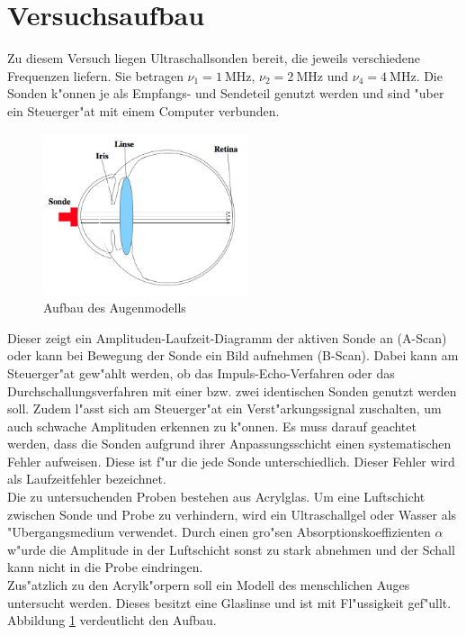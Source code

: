 \section{Versuchsaufbau} %
\label{sec:durchf_uhrung}
	Zu diesem Versuch liegen Ultraschallsonden bereit, die jeweils verschiedene Frequenzen liefern.
	Sie betragen $\nu_1 = \SI{1}{\mega \hertz}$, $\nu_2 = \SI{2}{\mega \hertz}$ und $\nu_4 = \SI{4}{\mega \hertz}$.
	Die Sonden k"onnen je als Empfangs- und Sendeteil genutzt werden und sind "uber ein Steuerger"at mit einem Computer verbunden.

	\begin{figure}
		\centering
		\includegraphics[width = 6cm]{img/auge.jpeg}
		\caption{Aufbau des Augenmodells \cite{anleitung} \label{fig:auge}}
	\end{figure}

	Dieser zeigt ein Amplituden-Laufzeit-Diagramm der aktiven Sonde an (A-Scan) oder kann bei Bewegung der Sonde ein Bild aufnehmen (B-Scan).
	Dabei kann am Steuerger"at gew"ahlt werden, ob das Impuls-Echo-Verfahren oder das Durchschallungsverfahren mit einer bzw. zwei identischen Sonden genutzt werden soll.
	Zudem l"asst sich am Steuerger"at ein Verst"arkungssignal zuschalten, um auch schwache Amplituden erkennen zu k"onnen.
	Es muss darauf geachtet werden, dass die Sonden aufgrund ihrer Anpassungsschicht einen systematischen Fehler aufweisen. Diese ist f"ur die jede Sonde unterschiedlich. Dieser Fehler wird als Laufzeitfehler bezeichnet. \\

	Die zu untersuchenden Proben bestehen aus Acrylglas.
	Um eine Luftschicht zwischen Sonde und Probe zu verhindern, wird ein Ultraschallgel oder Wasser als "Ubergangsmedium verwendet.
	Durch einen gro"sen Absorptionskoeffizienten $\alpha$ w"urde die Amplitude in der Luftschicht sonst zu stark abnehmen und der Schall kann nicht in die Probe eindringen. \\

	Zus"atzlich zu den Acrylk"orpern soll ein Modell des menschlichen Auges untersucht werden.
	Dieses besitzt eine Glaslinse und ist mit Fl"ussigkeit gef"ullt.
	Abbildung \ref{fig:auge} verdeutlicht den Aufbau.
	
